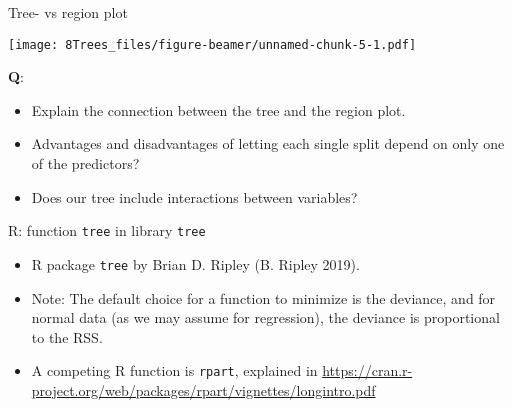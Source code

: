 \documentclass[
  10pt,
  ignorenonframetext,
]{beamer}
\providecommand{\tightlist}{%
  \setlength{\itemsep}{0pt}\setlength{\parskip}{0pt}}
\begin{document}
\begin{frame}
\begin{block}{Tree- vs region plot}
\protect\hypertarget{tree--vs-region-plot}{}
\vspace{2mm}

\texttt{[image: 8Trees\_files/figure-beamer/unnamed-chunk-5-1.pdf]}

\vspace{-2mm}

\textbf{Q}:

\begin{itemize}
\tightlist
\item
  Explain the connection between the tree and the region plot.
\item
  Advantages and disadvantages of letting each single split depend on
  only one of the predictors?
\item
  Does our tree include interactions between variables?
\end{itemize}
\end{block}
\end{frame}

\begin{frame}[fragile]
\begin{block}{R: function \texttt{tree} in library \texttt{tree}}
\protect\hypertarget{r-function-tree-in-library-tree}{}
\vspace{2mm}

\begin{itemize}
\tightlist
\item
  R package \texttt{tree} by Brian D. Ripley (B. Ripley 2019).
\end{itemize}

\vspace{2mm}

\begin{itemize}
\tightlist
\item
  Note: The default choice for a function to minimize is the deviance,
  and for normal data (as we may assume for regression), the deviance is
  proportional to the RSS.
\end{itemize}

\vspace{2mm}

\begin{itemize}
\tightlist
\item
  A competing R function is \texttt{rpart}, explained in
  \url{https://cran.r-project.org/web/packages/rpart/vignettes/longintro.pdf}
\end{itemize}
\end{block}
\end{frame}
\end{document}

